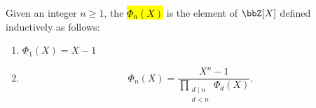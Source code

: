 \begin{definition} \label{definition:cyclotomic_polynomial}
    Given an integer $n \geq 1$, the  \hl{$\Phi_n(X)$} is the element of $\bbZ[X]$ defined inductively as follows:
    \begin{enumerate}
        \item $\Phi_1(X) = X-1$
        \item 
        $$\Phi_n(X) = \frac{X^n-1}{\prod_{\substack{d \mid n \\ d < n}} \Phi_d(X)}.$$
    \end{enumerate}

\end{definition}